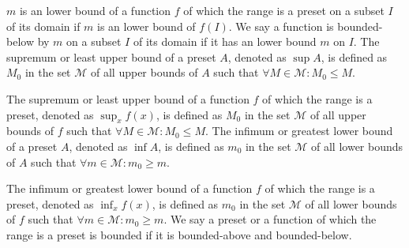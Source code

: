 \documentclass[a4paper,12pt]{article}
\begin{document}
$m$ is an lower bound of a function $f$ of which the range is a preset on a subset $I$ of its domain if $m$ is an lower bound of $f(I)$. We say a function is bounded-below by $m$ on a subset $I$ of its domain if it has an lower bound $m$ on $I$.
The supremum or least upper bound of a preset $A$, denoted as $\sup A$, is defined as $M_0$ in the set $\mathcal{M}$ of all upper bounds of $A$ such that $\forall M\in\mathcal{M}\colon M_0\leq M$.

The supremum or least upper bound of a function $f$ of which the range is a preset, denoted as $\sup_xf(x)$, is defined as $M_0$ in the set $\mathcal{M}$ of all upper bounds of $f$ such that $\forall M\in\mathcal{M}\colon M_0\leq M$.
The infimum or greatest lower bound of a preset $A$, denoted as $\inf A$, is defined as $m_0$ in the set $\mathcal{M}$ of all lower bounds of $A$ such that $\forall m\in\mathcal{M}\colon m_0\geq m$.

The infimum or greatest lower bound of a function $f$ of which the range is a preset, denoted as $\inf_xf(x)$, is defined as $m_0$ in the set $\mathcal{M}$ of all lower bounds of $f$ such that $\forall m\in\mathcal{M}\colon m_0\geq m$.
We say a preset or a function of which the range is a preset is bounded if it is bounded-above and bounded-below.
\end{document}
